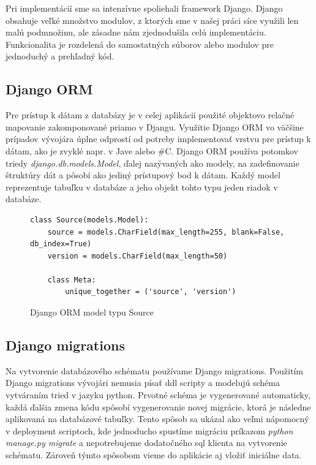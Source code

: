  
Pri implementácií sme sa intenzívne spoliehali framework Django. Django obsahuje veľké množstvo modulov, z ktorých sme v našej práci síce využili len malú podmnožinu, ale zásadne nám zjednodušila celú implementáciu. Funkcionalita je rozdelená do samostatných súborov alebo modulov pre jednoduchý a prehľadný kód.

\subsection{Django ORM}
Pre prístup k dátam z databázy je v celej aplikácii použité objektovo relačné mapovanie zakomponované priamo v Djangu. Využitie Django ORM vo väčšine prípadov vývojára úplne odprostí od potreby implementovať vrstvu pre prístup k dátam, ako je zvyklé napr. v Jave alebo \#C. Django ORM používa potomkov triedy \emph{django.db.models.Model}, ďalej nazývaných ako modely, na zadefinovanie štruktúry dát a pôsobí ako jediný prístupový bod k dátam. Každý model reprezentuje tabuľku v databáze a jeho objekt tohto typu jeden riadok v databáze. 

\begin{figure}[htbp]
\centering
\begin{minipage}{0.9\textwidth}
\lstset{columns=flexible,breaklines=true,breakatwhitespace=true, showstringspaces=false}
\begin{lstlisting}
class Source(models.Model):
    source = models.CharField(max_length=255, blank=False, db_index=True)
    version = models.CharField(max_length=50)

    class Meta:
        unique_together = ('source', 'version')
\end{lstlisting} 		
\end{minipage} 
\caption{Django ORM model typu Source}
\label{fig:static-analysis}
\end{figure}

\subsection{Django migrations}
Na vytvorenie databázového schématu používame Django migrations. Použitím Django migrations vývojári nemusia písať ddl scripty a modelujú schéma vytváraním tried v jazyku python. Prvotné schéma je vygenerované automaticky, každá ďalšia zmena kódu spôsobí vygenerovanie novej migrácie, ktorá je následne aplikovaná na databázové tabuľky. Tento spôsob sa ukázal ako veľmi nápomocný v deployment scriptoch, kde jednoducho spustíme migráciu príkazom \emph{python manage.py migrate} a nepotrebujeme dodatočného sql klienta na vytvorenie schématu. Zároveň týmto spôsobom vieme do aplikácie aj vložiť iniciálne data.

